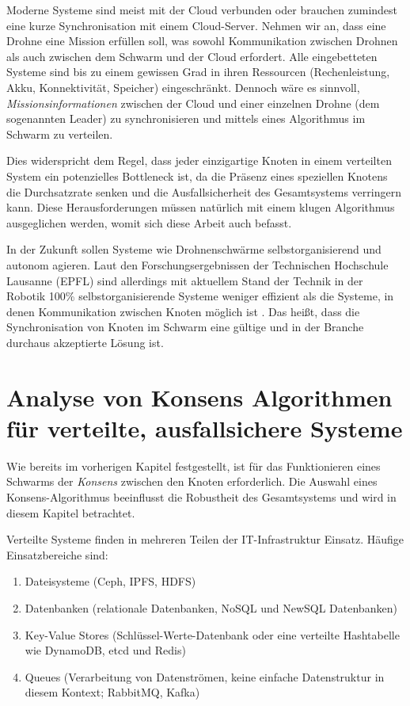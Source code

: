 Moderne Systeme sind meist mit der Cloud verbunden oder brauchen zumindest eine kurze Synchronisation mit einem Cloud-Server. Nehmen wir an, dass eine Drohne eine Mission erfüllen soll, was sowohl Kommunikation zwischen Drohnen als auch zwischen dem Schwarm und der Cloud erfordert. Alle eingebetteten Systeme sind bis zu einem gewissen Grad in ihren Ressourcen (Rechenleistung, Akku, Konnektivität, Speicher) eingeschränkt. Dennoch wäre es sinnvoll, \textit{Missionsinformationen} zwischen der Cloud und einer einzelnen Drohne (dem sogenannten Leader) zu synchronisieren und mittels eines Algorithmus im Schwarm zu verteilen.

Dies widerspricht dem Regel, dass jeder einzigartige Knoten in einem verteilten System ein potenzielles Bottleneck ist, da die Präsenz eines speziellen Knotens die Durchsatzrate senken und die Ausfallsicherheit des Gesamtsystems verringern kann. Diese Herausforderungen müssen natürlich mit einem klugen Algorithmus ausgeglichen werden, womit sich diese Arbeit auch befasst.

In der Zukunft sollen Systeme wie Drohnenschwärme selbstorganisierend und autonom agieren. Laut den Forschungsergebnissen der Technischen Hochschule Lausanne (EPFL) sind allerdings mit aktuellem Stand der Technik in der Robotik 100\% selbstorganisierende Systeme weniger effizient als die Systeme, in denen Kommunikation zwischen Knoten möglich ist \cite{EPFLswarm}. Das heißt, dass die Synchronisation von Knoten im Schwarm eine gültige und in der Branche durchaus akzeptierte Lösung ist.

\section{Analyse von Konsens Algorithmen für verteilte, ausfallsichere Systeme}
\label{cha:concurrency}

Wie bereits im vorherigen Kapitel festgestellt, ist für das Funktionieren eines Schwarms der \textit{Konsens} zwischen den Knoten erforderlich. Die Auswahl eines Konsens-Algorithmus beeinflusst die Robustheit des Gesamtsystems und wird in diesem Kapitel betrachtet.

Verteilte Systeme finden in mehreren Teilen der IT-Infrastruktur Einsatz. Häufige Einsatzbereiche sind:

\begin{enumerate}
	\item Dateisysteme (Ceph, IPFS, HDFS)
	
	\item Datenbanken (relationale Datenbanken, NoSQL und NewSQL Datenbanken)
	
	\item Key-Value Stores (Schlüssel-Werte-Datenbank oder eine verteilte Hashtabelle wie DynamoDB, etcd und Redis)
	
	\item Queues (Verarbeitung von Datenströmen, keine einfache Datenstruktur in diesem Kontext; RabbitMQ, Kafka)
\end{enumerate}


